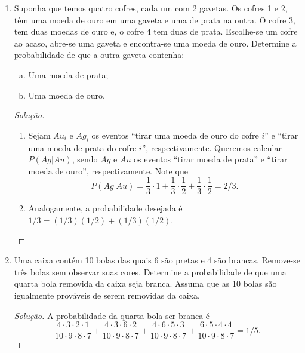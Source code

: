 \documentclass[../Notas.tex]{subfiles}
\begin{document}
\begin{enumerate}
\begin{proof}[Solução]
\[                   = \iint_{A\cap B} \, dx \, dy
                   = 1/8,
        \]
        e também $P(A) = 1/2 = P(B)$. Logo, $P(A\cup B) = 1 - 1/8 = 7/8$.
    \end{proof}
    \item Suponha que temos quatro cofres, cada um com 2 gavetas. Os cofres 1 e 2, têm uma moeda de ouro em uma gaveta e uma de prata na outra. O cofre 3, tem duas moedas de ouro e, o cofre 4 tem duas de prata. Escolhe-se um cofre ao acaso, abre-se uma gaveta e encontra-se uma moeda de ouro. Determine a probabilidade de que a outra gaveta contenha: 
    \begin{enumerate}[a)]
    \item Uma moeda de prata;
    \item Uma moeda de ouro.
    \end{enumerate}
    \begin{proof}[Solução]
        \begin{enumerate}
            \item Sejam $Au_i$ e $Ag_i$ os eventos ``tirar uma moeda de ouro do cofre $i$'' 
            e ``tirar uma moeda de prata do cofre $i$'', respectivamente. 
            Queremos calcular $P(Ag|Au)$, sendo $Ag$ e $Au$ os eventos
            ``tirar moeda de prata'' e ``tirar moeda de ouro'', respectivamente. Note que
            \[
            P(Ag|Au) = \frac{1}{3}\cdot 1 + \frac{1}{3}\cdot\frac{1}{2} + \frac{1}{3}\cdot\frac{1}{2}
                     = 2/3.
            \]
            \item Analogamente, a probabilidade desejada é $1/3 = (1/3)(1/2) + (1/3)(1/2)$.
        \end{enumerate}
    \end{proof}
    \item Uma caixa contém 10 bolas das quais 6 são pretas e 4 são brancas. Remove-se três bolas sem observar suas cores. Determine a probabilidade de que uma quarta bola removida da caixa seja branca. Assuma que as 10 bolas são igualmente prováveis de serem removidas da caixa.
    \begin{proof}[Solução]
        A probabilidade da quarta bola ser branca é
        \[
        \frac{4\cdot 3\cdot 2\cdot 1}{10\cdot 9\cdot 8\cdot 7} 
        + \frac{4\cdot 3\cdot 6\cdot 2}{10\cdot 9\cdot 8\cdot 7}
        + \frac{4\cdot 6\cdot 5\cdot 3}{10\cdot 9\cdot 8\cdot 7}
        + \frac{6\cdot 5\cdot 4\cdot 4}{10\cdot 9\cdot 8\cdot 7}
        = 1/5.
        \]

\end{proof}
\end{enumerate}
\end{document}
